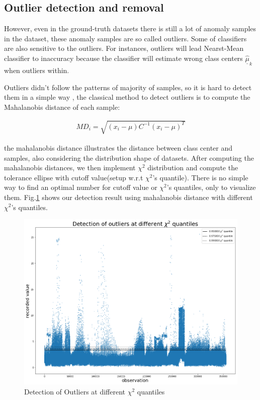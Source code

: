\documentclass[12pt,DIV14,BCOR12mm,a4paper,footinclude=false,headinclude,parskip=half-,twoside,openright,cleardoublepage=empty,toc=index,bibliography=totoc,listof=totoc]{scrreprt}
\numberwithin{equation}{chapter}
\begin{document}
\subsection{Outlier detection and removal}
However, even in the ground-truth datasets there is still a lot of anomaly samples in the dataset, these anomaly samples are so called outliers. Some of classifiers are also sensitive to the outliers. For instances, outliers will lead Nearst-Mean classifier to inaccuracy because the classifier will estimate wrong class centers $\underline{\hat{\mu}}_{k}$ when outliers within.

Outliers didn't follow the patterns of majority of samples, so it is hard to detect them in a simple way , the classical method to detect outliers is to compute the Mahalanobis distance of each sample:

\begin{align}
MD_i=\sqrt{(x_{i}-\mu)C^{-1}(x_{i}-\mu)^T}
\end{align}

the mahalanobis distance illustrates the distance between class center and samples, also considering the distribution shape of datasets. After computing the mahalanobis distances, we then implement $\chi^{2}$ distribution and compute the tolerance ellipse with cutoff value(setup w.r.t $\chi^{2}$'s quantile). There is no simple way to find an optimal number for cutoff value or $\chi^{2}$'s quantiles, only to visualize them. Fig.\ref{maha_outlier} shows our detection result using mahalanobis distance with different $\chi^{2}$'s quantiles.

\begin{figure}
	\centering
	\includegraphics[scale=0.45]{image/maha_outlier}
	\caption{Detection of Outliers at different $\chi^{2}$ quantiles}
	\label{maha_outlier}
\end{figure}
\end{document}

